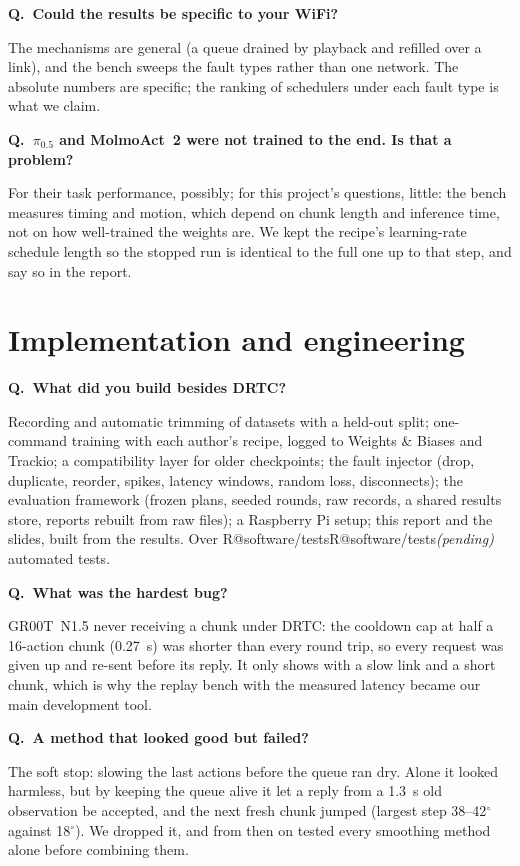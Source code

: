 \documentclass[11pt,a4paper]{article}
\makeatletter
\newcommand{\R}[1]{\ifcsname R@#1\endcsname\csname R@#1\endcsname\else\pending\fi}
\newcommand{\pending}{\textit{\color{warn}(pending)}}
\newcommand{\drtc}{DRTC}
\newcommand{\groot}{GR00T~N1.5}
\newcommand{\pizerofive}{$\pi_{0.5}$}
\newcommand{\degree}{$^\circ$}
\newcounter{qn}
\newcommand{\q}[2]{\stepcounter{qn}\par\medskip
  {\bfseries\color{accent}Q\theqn.\ #1}\par\nopagebreak[4]#2\par}
\makeatother
\begin{document}
\q{Could the results be specific to your WiFi?}{The mechanisms are general (a queue drained by playback and refilled
over a link), and the bench sweeps the fault types rather than one network. The absolute numbers are specific; the
ranking of schedulers under each fault type is what we claim.}

\q{\pizerofive{} and MolmoAct~2 were not trained to the end. Is that a problem?}{For their task performance, possibly;
for this project's questions, little: the bench measures timing and motion, which depend on chunk length and inference
time, not on how well-trained the weights are. We kept the recipe's learning-rate schedule length so the stopped run is
identical to the full one up to that step, and say so in the report.}

\section{Implementation and engineering}

\q{What did you build besides \drtc?}{Recording and automatic trimming of datasets with a held-out split; one-command
training with each author's recipe, logged to Weights \& Biases and Trackio; a compatibility layer for older
checkpoints; the fault injector (drop, duplicate, reorder, spikes, latency windows, random loss, disconnects); the
evaluation framework (frozen plans, seeded rounds, raw records, a shared results store, reports rebuilt from raw files);
a Raspberry Pi setup; this report and the slides, built from the results. Over \R{software/tests} automated tests.}

\q{What was the hardest bug?}{\groot{} never receiving a chunk under \drtc: the cooldown cap at half a 16-action chunk
(0.27~s) was shorter than every round trip, so every request was given up and re-sent before its reply. It only shows
with a slow link and a short chunk, which is why the replay bench with the measured latency became our main
development tool.}

\q{A method that looked good but failed?}{The soft stop: slowing the last actions before the queue ran dry. Alone it
looked harmless, but by keeping the queue alive it let a reply from a 1.3~s old observation be accepted, and the next
fresh chunk jumped (largest step 38--42\degree{} against 18\degree). We dropped it, and from then on tested every
smoothing method alone before combining them.}
\end{document}
